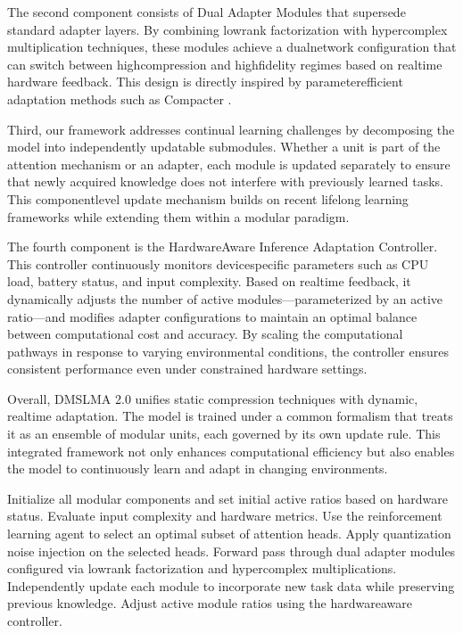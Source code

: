 \documentclass{article} %
\begin{document}
The second component consists of Dual Adapter Modules that supersede standard adapter layers. By combining low\-rank factorization with hypercomplex multiplication techniques, these modules achieve a dual\-network configuration that can switch between high\-compression and high\-fidelity regimes based on real\-time hardware feedback. This design is directly inspired by parameter\-efficient adaptation methods such as Compacter \cite{mahabadi2021compacter}.

Third, our framework addresses continual learning challenges by decomposing the model into independently updatable submodules. Whether a unit is part of the attention mechanism or an adapter, each module is updated separately to ensure that newly acquired knowledge does not interfere with previously learned tasks. This component\-level update mechanism builds on recent lifelong learning frameworks \cite{sun2019lamol, chaudhry2018lifelong} while extending them within a modular paradigm.

The fourth component is the Hardware\-Aware Inference Adaptation Controller. This controller continuously monitors device\-specific parameters such as CPU load, battery status, and input complexity. Based on real\-time feedback, it dynamically adjusts the number of active modules—parameterized by an active ratio—and modifies adapter configurations to maintain an optimal balance between computational cost and accuracy. By scaling the computational pathways in response to varying environmental conditions, the controller ensures consistent performance even under constrained hardware settings.

Overall, DMS\-LMA 2.0 unifies static compression techniques with dynamic, real\-time adaptation. The model is trained under a common formalism that treats it as an ensemble of modular units, each governed by its own update rule. This integrated framework not only enhances computational efficiency but also enables the model to continuously learn and adapt in changing environments.

\begin{algorithm}
\begin{algorithmic}
  \State Initialize all modular components and set initial active ratios based on hardware status.
    \State Evaluate input complexity and hardware metrics.
    \State Use the reinforcement learning agent to select an optimal subset of attention heads.
    \State Apply quantization noise injection on the selected heads.
    \State Forward pass through dual adapter modules configured via low\-rank factorization and hypercomplex multiplications.
    \State Independently update each module to incorporate new task data while preserving previous knowledge.
    \State Adjust active module ratios using the hardware\-aware controller.
  \EndFor
\end{algorithmic}
\end{algorithm}
\end{document}
